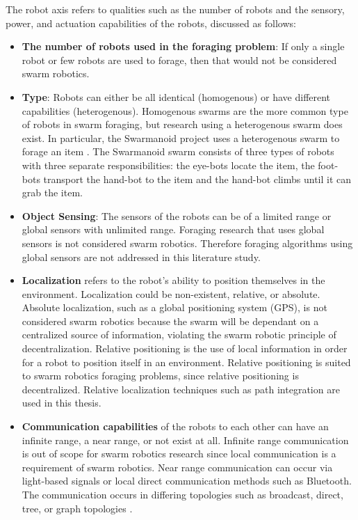The robot axis refers to qualities such as the number of robots and the sensory, power, and actuation capabilities of the robots, discussed as follows:

\begin{itemize}
\item \textbf{The number of robots used in the foraging problem}: If only a single robot or few robots are used to forage, then that would not be considered swarm robotics.

\item \textbf{Type}: Robots can either be all identical (homogenous) or have different capabilities (heterogenous). Homogenous swarms are the more common type of robots in swarm foraging, but research using a heterogenous swarm does exist. In particular, the Swarmanoid project uses a heterogenous swarm to forage an item \cite{dorigo2013swarmanoid}. The Swarmanoid swarm consists of three types of robots with three separate responsibilities: the eye-bots locate the item, the foot-bots transport the hand-bot to the item and the hand-bot climbs until it can grab the item. 

\item \textbf{Object Sensing}: The sensors of the robots can be of a limited range or global sensors with unlimited range. Foraging research that uses global sensors is not considered swarm robotics. Therefore foraging algorithms using global sensors are not addressed in this literature study.

\item \textbf{Localization} refers to the robot's ability to position themselves in the environment. Localization could be non-existent, relative, or absolute. Absolute localization, such as a global positioning system (GPS), is not considered swarm robotics because the swarm will be dependant on a centralized source of information, violating the swarm robotic principle of decentralization. Relative positioning is the use of local information in order for a robot to position itself in an environment. Relative positioning is suited to swarm robotics foraging problems, since relative positioning is decentralized. Relative localization techniques such as path integration are used in this thesis.

\item \textbf{Communication capabilities} of the robots to each other can have an infinite range, a near range, or not exist at all. Infinite range communication is out of scope for swarm robotics research since local communication is a requirement of swarm robotics. Near range communication can occur via light-based signals \cite{sugawara2002swarming} or local direct communication methods such as Bluetooth. The communication occurs in differing topologies such as broadcast, direct, tree, or graph topologies \cite{dudek1993taxonomy}.


\end{itemize}
